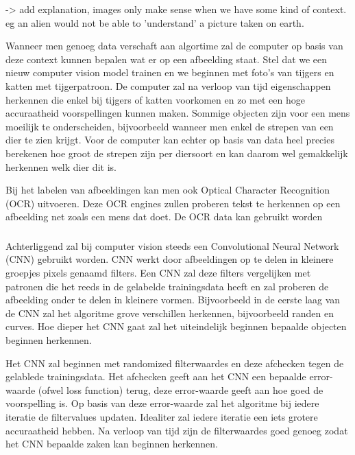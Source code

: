 -> add explanation, images only make sense when we have some kind of context. eg an alien would not be able to 'understand' a picture taken on earth.

Wanneer men genoeg data verschaft aan algortime zal de computer op basis van deze context kunnen bepalen wat er op een afbeelding staat. Stel dat we een nieuw computer vision model trainen en we beginnen met foto's van tijgers en katten met tijgerpatroon. De computer zal na verloop van tijd eigenschappen herkennen die enkel bij tijgers of katten voorkomen en zo met een hoge accuraatheid voorspellingen kunnen maken. Sommige objecten zijn voor een mens moeilijk te onderscheiden, bijvoorbeeld wanneer men enkel de strepen van een dier te zien krijgt. Voor de computer kan echter op basis van data heel precies berekenen hoe groot de strepen zijn per diersoort en kan daarom wel gemakkelijk herkennen welk dier dit is.

Bij  het labelen van afbeeldingen kan men ook Optical Character Recognition (OCR) uitvoeren. Deze OCR engines zullen proberen tekst te herkennen op een afbeelding net zoals een mens dat doet. De OCR data kan gebruikt worden 

\subsubsection{}
\label{sec:convolutional-neural-network}
Achterliggend zal bij computer vision steeds een Convolutional Neural Network (CNN) gebruikt worden. CNN werkt door afbeeldingen op te delen in kleinere groepjes pixels genaamd filters. Een CNN zal deze filters vergelijken met patronen die het reeds in de gelabelde trainingsdata heeft en zal proberen de afbeelding onder te delen in kleinere vormen. Bijvoorbeeld in de eerste laag van de CNN zal het algoritme grove verschillen herkennen, bijvoorbeeld randen en curves.
Hoe dieper het CNN gaat zal het uiteindelijk beginnen bepaalde objecten beginnen herkennen.

Het CNN zal beginnen met randomized filterwaardes en deze afchecken tegen de gelablede trainingsdata. Het afchecken geeft aan het CNN een bepaalde error-waarde (ofwel loss function) terug, deze error-waarde geeft aan hoe goed de voorspelling is. Op basis van deze error-waarde zal het algoritme bij iedere iteratie de filtervalues updaten. Idealiter zal iedere iteratie een iets grotere accuraatheid hebben. Na verloop van tijd zijn de filterwaardes goed genoeg zodat het CNN bepaalde zaken kan beginnen herkennen.

